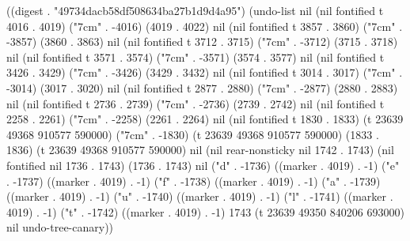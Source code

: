 
((digest . "49734dacb58df508634ba27b1d9d4a95") (undo-list nil (nil fontified t 4016 . 4019) ("7cm" . -4016) (4019 . 4022) nil (nil fontified t 3857 . 3860) ("7cm" . -3857) (3860 . 3863) nil (nil fontified t 3712 . 3715) ("7cm" . -3712) (3715 . 3718) nil (nil fontified t 3571 . 3574) ("7cm" . -3571) (3574 . 3577) nil (nil fontified t 3426 . 3429) ("7cm" . -3426) (3429 . 3432) nil (nil fontified t 3014 . 3017) ("7cm" . -3014) (3017 . 3020) nil (nil fontified t 2877 . 2880) ("7cm" . -2877) (2880 . 2883) nil (nil fontified t 2736 . 2739) ("7cm" . -2736) (2739 . 2742) nil (nil fontified t 2258 . 2261) ("7cm" . -2258) (2261 . 2264) nil (nil fontified t 1830 . 1833) (t 23639 49368 910577 590000) ("7cm" . -1830) (t 23639 49368 910577 590000) (1833 . 1836) (t 23639 49368 910577 590000) nil (nil rear-nonsticky nil 1742 . 1743) (nil fontified nil 1736 . 1743) (1736 . 1743) nil ("d" . -1736) ((marker . 4019) . -1) ("e" . -1737) ((marker . 4019) . -1) ("f" . -1738) ((marker . 4019) . -1) ("a" . -1739) ((marker . 4019) . -1) ("u" . -1740) ((marker . 4019) . -1) ("l" . -1741) ((marker . 4019) . -1) ("t" . -1742) ((marker . 4019) . -1) 1743 (t 23639 49350 840206 693000) nil undo-tree-canary))
